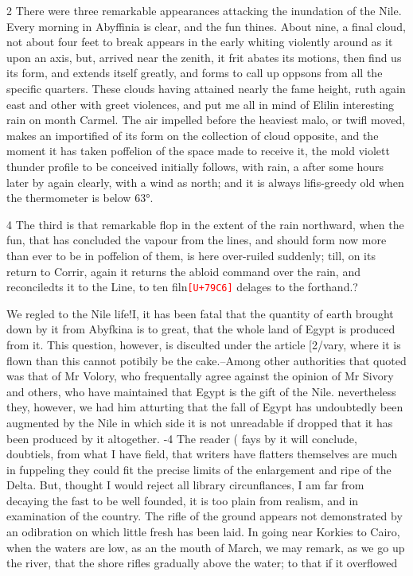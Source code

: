 \documentclass[10pt]{article}
\newcommand{\unk}[1]{\textcolor{red}{\texttt{\scriptsize[U+#1]}}}
\begin{document}
\begin{multicols}{2}
There were three remarkable appearances attacking the inundation of the Nile. Every morning in Abyffinia is clear, and the fun thines. About nine, a final cloud, not about four feet to break appears in the early whiting violently around as it upon an axis, but, arrived near the zenith, it frit abates its motions, then find us its form, and extends itself greatly, and forms to call up oppsons from all the specific quarters. These clouds having attained nearly the fame height, ruth again east and other with greet violences, and put me all in mind of Elilin interesting rain on month Carmel. The air impelled before the heaviest malo, or twifl moved, makes an importified of its form on the collection of cloud opposite, and the moment it has taken poffelion of the space made to receive it, the mold violett thunder profile to be conceived initially follows, with rain, a after some hours later by again clearly, with a wind as north; and it is always lifis-greedy old when the thermometer is below 63°.

4 The third is that remarkable flop in the extent of the rain northward, when the fun, that has concluded the vapour from the lines, and should form now more than ever to be in poffelion of them, is here over-ruiled suddenly; till, on its return to Corrir, again it returns the abloid command over the rain, and reconciledts it to the Line, to ten filn\unk{79C6} delages to the forthand.?

We regled to the Nile life!I, it has been fatal that the quantity of earth brought down by it from Abyfkina is to great, that the whole land of Egypt is produced from it. This question, however, is disculted under the article [2/vary, where it is flown than this cannot potibily be the cake.--Among other authorities that quoted was that of Mr Volory, who frequentally agree against the opinion of Mr Sivory and others, who have maintained that Egypt is the gift of the Nile. nevertheless they, however, we had him atturting that the fall of Egypt has undoubtedly been augmented by the Nile in which side it is not unreadable if dropped that it has been produced by it altogether. -4 The reader ( fays by it will conclude, doubtiels, from what I have field, that writers have flatters themselves are much in fuppeling they could fit the precise limits of the enlargement and ripe of the Delta. But, thought I would reject all library circunflances, I am far from decaying the fast to be well founded, it is too plain from realism, and in examination of the country. The rifle of the ground appears not demonstrated by an odibration on which little fresh has been laid. In going near Korkies to Cairo, when the waters are low, as an the mouth of March, we may remark, as we go up the river, that the shore rifles gradually above the water; to that if it overflowed

\end{multicols}
\end{document}
